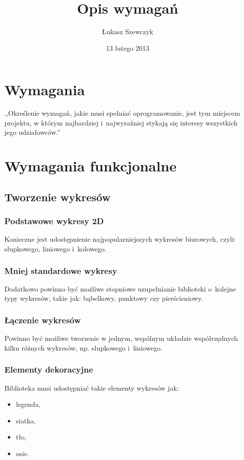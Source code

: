 \documentclass[11pt,twoside,a4paper,final]{article}
\begin{document}
\date{13 lutego 2013}
\title{Opis wymagań}

\author{Łukasz Szewczyk}

\maketitle

\section{Wymagania}
,,Określenie wymagań, jakie musi spełniać oprogramowanie, jest tym miejscem projektu, w którym najbardziej i~najwyraźniej stykają się interesy wszystkich jego udziałowców.''~\cite{sacha-wymagania}

\section{Wymagania funkcjonalne}

\subsection{Tworzenie wykresów}

\subsubsection{Podstawowe wykresy 2D}
Konieczne jest udostępnienie najpopularniejszych wykresów biurowych, czyli: słupkowego, liniowego i~kołowego. 

\subsubsection{Mniej standardowe wykresy}
Dodatkowo powinno być możliwe stopniowe uzupełnianie biblioteki o~kolejne typy wykresów, takie jak: bąbelkowy, punktowy czy pierścieniowy.

\subsubsection{Łączenie wykresów}
Powinno być możliwe tworzenie w jednym, wspólnym układzie współrzędnych kilku różnych wykresów, np. słupkowego i~liniowego.

\subsubsection{Elementy dekoracyjne}
Biblioteka musi udostępniać takie elementy wykresów jak:
\begin{itemize}
\item {legenda,}
\item {siatka,}
\item {tło,}
\item {osie.}
\end{itemize}
 
\end{document}
